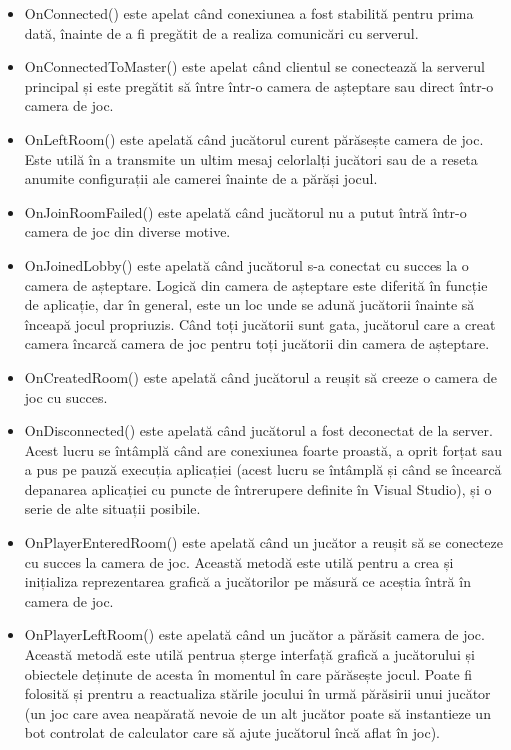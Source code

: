\documentclass[12pt, a4paper]{article}
\begin{document}
	\begin{itemize}
		\item OnConnected() este apelat când conexiunea a fost stabilită pentru prima dată, înainte de a fi pregătit de a realiza comunicări cu serverul.
		\item OnConnectedToMaster() este apelat când clientul se conectează la serverul principal și este pregătit să între într-o camera de așteptare sau direct într-o camera de joc.
		\item OnLeftRoom() este apelată când jucătorul curent părăsește camera de joc. Este utilă în a transmite un ultim mesaj celorlalți jucători sau de a reseta anumite configurații ale camerei înainte de a părăși jocul.
		\item OnJoinRoomFailed() este apelată când jucătorul nu a putut întră într-o camera de joc din diverse motive.
		\item OnJoinedLobby() este apelată când jucătorul s-a conectat cu succes la o camera de așteptare. Logică din camera de așteptare este diferită în funcție de aplicație, dar în general, este un loc unde se adună jucătorii înainte să înceapă jocul propriuzis. Când toți jucătorii sunt gata, jucătorul care a creat camera încarcă camera de joc pentru toți jucătorii din camera de așteptare.
		\item OnCreatedRoom() este apelată când jucătorul a reușit să creeze o camera de joc cu succes.
		\item OnDisconnected() este apelată când jucătorul a fost deconectat de la server. Acest lucru se întâmplă când are conexiunea foarte proastă, a oprit forțat sau a pus pe pauză execuția aplicației (acest lucru se întâmplă și când se încearcă depanarea aplicației cu puncte de întrerupere definite în Visual Studio), și o serie de alte situații posibile.
		\item OnPlayerEnteredRoom() este apelată când un jucător a reușit să se conecteze cu succes la camera de joc. Această metodă este utilă pentru a crea și inițializa reprezentarea grafică a jucătorilor pe măsură ce aceștia întră în camera de joc.
		\item OnPlayerLeftRoom() este apelată când un jucător a părăsit camera de joc. Această metodă este utilă pentrua șterge interfață grafică a jucătorului și obiectele deținute de acesta în momentul în care părăsește jocul. Poate fi folosită și prentru a reactualiza stările jocului în urmă părăsirii unui jucător (un joc care avea neapărată nevoie de un alt jucător poate să instantieze un bot controlat de calculator care să ajute jucătorul încă aflat în joc).
	\end{itemize}
	
\end{document}
